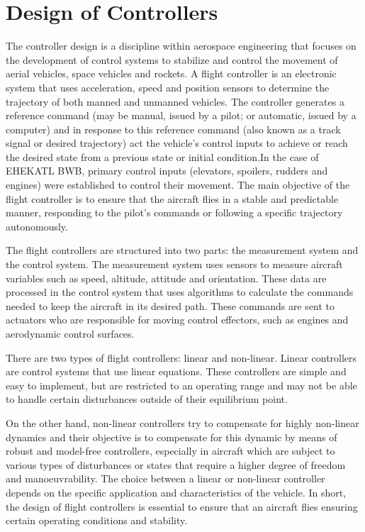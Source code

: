 \chapter{Design of Controllers}

The controller design is a discipline within aerospace engineering that focuses on the development of control systems to stabilize and control the movement of aerial vehicles, space vehicles and rockets. A flight controller is an electronic system that uses acceleration, speed and position sensors to determine the trajectory of both manned and unmanned vehicles. The controller generates a reference command (may be manual, issued by a pilot; or automatic, issued by a computer) and in response to this reference command (also known as a track signal or desired trajectory) act the vehicle's control inputs to achieve or reach the desired state from a previous state or initial condition.In the case of EHEKATL BWB, primary control inputs (elevators, spoilers, rudders and engines) were established to control their movement. The main objective of the flight controller is to ensure that the aircraft flies in a stable and predictable manner, responding to the pilot's commands or following a specific trajectory autonomously.

The flight controllers are structured into two parts: the measurement system and the control system. The measurement system uses sensors to measure aircraft variables such as speed, altitude, attitude and orientation. These data are processed in the control system that uses algorithms to calculate the commands needed to keep the aircraft in its desired path. These commands are sent to actuators who are responsible for moving control effectors, such as engines and aerodynamic control surfaces.

There are two types of flight controllers: linear and non-linear. Linear controllers are control systems that use linear equations. These controllers are simple and easy to implement, but are restricted to an operating range and may not be able to handle certain disturbances outside of their equilibrium point. 

On the other hand, non-linear controllers try to compensate for highly non-linear dynamics and their objective is to compensate for this dynamic by means of robust and model-free controllers, especially in aircraft which are subject to various types of disturbances or states that require a higher degree of freedom and manoeuvrability. The choice between a linear or non-linear controller depends on the specific application and characteristics of the vehicle. In short, the design of flight controllers is essential to ensure that an aircraft flies ensuring certain operating conditions and stability.  

